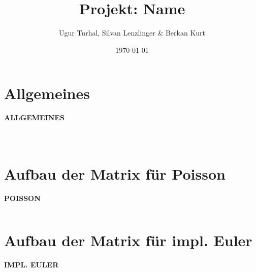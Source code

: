 \documentclass[aspectratio=169]{beamer}
\title{Projekt: Name}
\author{Ugur Turhal, Silvan Lenzlinger \& Berkan Kurt}
\institute{Universit\"at Basel}
\date{\today}
\begin{document}
\frame{\maketitle}
\frame{\tableofcontents}


\section{Allgemeines} 
\begin{frame}[fragile]
\textbf{ALLGEMEINES}
\begin{columns}
\begin{column}{0.5\textwidth}

\end{column}

\begin{column}{0.5\textwidth}
\begin{lstlisting}

\end{lstlisting}
\end{column}

\end{columns}
\end{frame}



\section{Aufbau der Matrix für Poisson} 
\begin{frame}[fragile]
\textbf{POISSON}
\begin{columns}
\begin{column}{0.5\textwidth}


\end{column}

\begin{column}{0.5\textwidth}

\end{column}

\end{columns}
\end{frame}

\section{Aufbau der Matrix für impl. Euler} 
\begin{frame}[fragile]
\textbf{IMPL. EULER}

\begin{columns}
\begin{column}{0.45\textwidth}


\end{column}
\begin{column}{0.5\textwidth}

\end{column}

\end{columns}
\end{frame}
\end{document}

